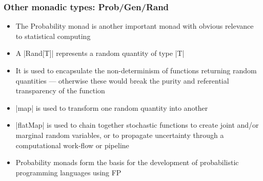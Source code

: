 \documentclass[mathserif,handout]{beamer}
\begin{document}

\begin{frame}[fragile]
  \frametitle{Other monadic types: Prob/Gen/Rand}
  \begin{itemize}
  \item The \alert{Probability monad} is another important monad with obvious relevance to statistical computing
  \item A |Rand[T]| represents a random quantity of type |T|
  \item It is used to encapsulate the non-determinism of functions returning random quantities --- otherwise these would break the \alert{purity} and \alert{referential transparency} of the function
  \item |map| is used to transform one random quantity into another
  \item |flatMap| is used to chain together stochastic functions to create joint and/or marginal random variables, or to \alert{propagate uncertainty} through a computational work-flow or pipeline
    \item Probability monads form the basis for the development of \alert{probabilistic programming languages} using FP
  \end{itemize}
\end{frame}
\end{document}
